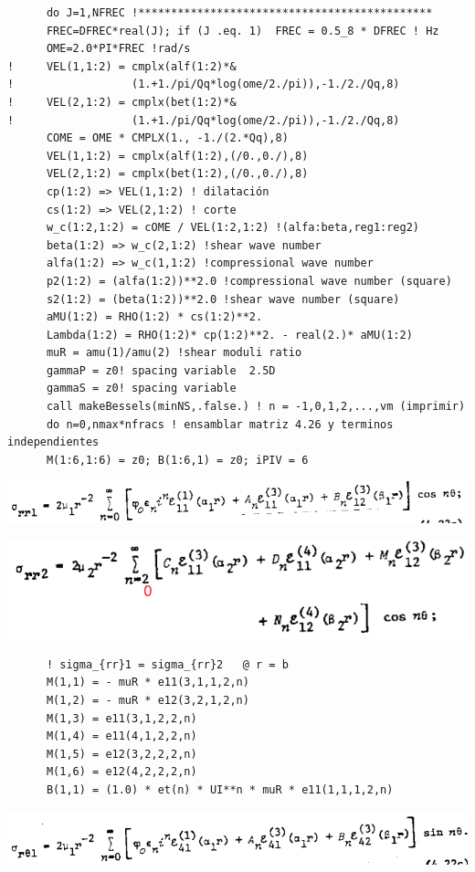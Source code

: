 \documentclass [11pt,spanish]{article}
\begin{document}
\begingroup
\fontsize{10pt}{12pt}
\selectfont
{}
\begin{shaded}
\begin{verbatim}
      do J=1,NFREC !*********************************************
      FREC=DFREC*real(J); if (J .eq. 1)  FREC = 0.5_8 * DFREC ! Hz
      OME=2.0*PI*FREC !rad/s
!     VEL(1,1:2) = cmplx(alf(1:2)*& 
!                  (1.+1./pi/Qq*log(ome/2./pi)),-1./2./Qq,8)
!     VEL(2,1:2) = cmplx(bet(1:2)*& 
!                  (1.+1./pi/Qq*log(ome/2./pi)),-1./2./Qq,8)
      COME = OME * CMPLX(1., -1./(2.*Qq),8)
      VEL(1,1:2) = cmplx(alf(1:2),(/0.,0./),8)
      VEL(2,1:2) = cmplx(bet(1:2),(/0.,0./),8)
      cp(1:2) => VEL(1,1:2) ! dilatación
      cs(1:2) => VEL(2,1:2) ! corte
      w_c(1:2,1:2) = cOME / VEL(1:2,1:2) !(alfa:beta,reg1:reg2)
      beta(1:2) => w_c(2,1:2) !shear wave number
      alfa(1:2) => w_c(1,1:2) !compressional wave number
      p2(1:2) = (alfa(1:2))**2.0 !compressional wave number (square)
      s2(1:2) = (beta(1:2))**2.0 !shear wave number (square)
      aMU(1:2) = RHO(1:2) * cs(1:2)**2.
      Lambda(1:2) = RHO(1:2)* cp(1:2)**2. - real(2.)* aMU(1:2)
      muR = amu(1)/amu(2) !shear moduli ratio
      gammaP = z0! spacing variable  2.5D
      gammaS = z0! spacing variable
      call makeBessels(minNS,.false.) ! n = -1,0,1,2,...,vm (imprimir)
      do n=0,nmax*nfracs ! ensamblar matriz 4.26 y terminos independientes
      M(1:6,1:6) = z0; B(1:6,1) = z0; iPIV = 6
\end{verbatim}
\end{shaded}
\endgroup
\includegraphics[scale=0.5]{srr1}

\includegraphics[scale=0.5]{srr2}
\begingroup
\fontsize{10pt}{12pt}
\selectfont
{}
\begin{shaded}
\begin{verbatim}
      ! sigma_{rr}1 = sigma_{rr}2   @ r = b
      M(1,1) = - muR * e11(3,1,1,2,n)
      M(1,2) = - muR * e12(3,2,1,2,n)
      M(1,3) = e11(3,1,2,2,n)
      M(1,4) = e11(4,1,2,2,n)
      M(1,5) = e12(3,2,2,2,n)
      M(1,6) = e12(4,2,2,2,n) 
      B(1,1) = (1.0) * et(n) * UI**n * muR * e11(1,1,1,2,n)
\end{verbatim}
\end{shaded}
\endgroup
\includegraphics[scale=0.5]{srt1}
\end{document}

